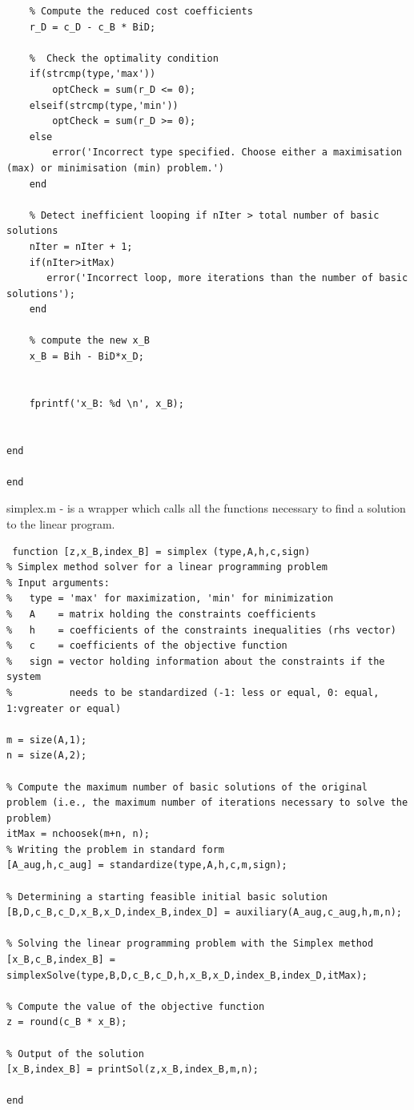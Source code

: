 \documentclass[unicode,11pt,a4paper,oneside,numbers=endperiod,openany]{scrartcl}
\begin{document}
\begin{lstlisting}
    % Compute the reduced cost coefficients
    r_D = c_D - c_B * BiD;

    %  Check the optimality condition
    if(strcmp(type,'max'))
        optCheck = sum(r_D <= 0);
    elseif(strcmp(type,'min'))
        optCheck = sum(r_D >= 0);
    else
        error('Incorrect type specified. Choose either a maximisation (max) or minimisation (min) problem.')
    end

    % Detect inefficient looping if nIter > total number of basic solutions
    nIter = nIter + 1;
    if(nIter>itMax)
       error('Incorrect loop, more iterations than the number of basic solutions');
    end

    % compute the new x_B
    x_B = Bih - BiD*x_D;


    fprintf('x_B: %d \n', x_B);


end

end
\end{lstlisting}

simplex.m - is a wrapper which calls all the functions necessary to find a solution to the linear program.
\begin{lstlisting}
 function [z,x_B,index_B] = simplex (type,A,h,c,sign)
% Simplex method solver for a linear programming problem
% Input arguments:
%   type = 'max' for maximization, 'min' for minimization
%   A    = matrix holding the constraints coefficients
%   h    = coefficients of the constraints inequalities (rhs vector)
%   c    = coefficients of the objective function
%   sign = vector holding information about the constraints if the system
%          needs to be standardized (-1: less or equal, 0: equal, 1:vgreater or equal)

m = size(A,1);
n = size(A,2);

% Compute the maximum number of basic solutions of the original problem (i.e., the maximum number of iterations necessary to solve the problem)
itMax = nchoosek(m+n, n);
% Writing the problem in standard form
[A_aug,h,c_aug] = standardize(type,A,h,c,m,sign);

% Determining a starting feasible initial basic solution
[B,D,c_B,c_D,x_B,x_D,index_B,index_D] = auxiliary(A_aug,c_aug,h,m,n);

% Solving the linear programming problem with the Simplex method
[x_B,c_B,index_B] = simplexSolve(type,B,D,c_B,c_D,h,x_B,x_D,index_B,index_D,itMax);

% Compute the value of the objective function
z = round(c_B * x_B);

% Output of the solution
[x_B,index_B] = printSol(z,x_B,index_B,m,n);

end
\end{lstlisting}
\end{document}
